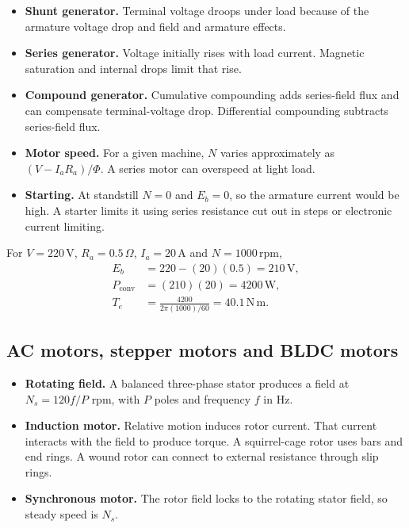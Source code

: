 \documentclass[12pt,a4paper]{article}
\begin{document}
\begin{itemize}[leftmargin=*, itemsep=3pt, topsep=4pt]
  \item \textbf{Shunt generator.} Terminal voltage droops under load because of the armature voltage drop and field and armature effects.
  \item \textbf{Series generator.} Voltage initially rises with load current. Magnetic saturation and internal drops limit that rise.
  \item \textbf{Compound generator.} Cumulative compounding adds series-field flux and can compensate terminal-voltage drop. Differential compounding subtracts series-field flux.
  \item \textbf{Motor speed.} For a given machine, \(N\) varies approximately as \((V-I_aR_a)/\Phi\). A series motor can overspeed at light load.
  \item \textbf{Starting.} At standstill \(N=0\) and \(E_b=0\), so the armature current would be high. A starter limits it using series resistance cut out in steps or electronic current limiting.
\end{itemize}

\begin{tcolorbox}[examplebox,title={DC motor back emf and converted torque}]
For \(V=220\,\mathrm V\), \(R_a=0.5\,\Omega\), \(I_a=20\,\mathrm A\) and \(N=1000\,\mathrm{rpm}\),
\[
\begin{aligned}
E_b&=220-(20)(0.5)=210\,\mathrm V,\\
P_{\mathrm{conv}}&=(210)(20)=4200\,\mathrm W,\\
T_e&=\frac{4200}{2\pi(1000)/60}=40.1\,\mathrm{N\,m}.
\end{aligned}
\]
\end{tcolorbox}

\subsection{AC motors, stepper motors and BLDC motors}
\begin{itemize}[leftmargin=*, itemsep=3pt, topsep=4pt]
  \item \textbf{Rotating field.} A balanced three-phase stator produces a field at \(N_s=120f/P\) rpm, with \(P\) poles and frequency \(f\) in Hz.
  \item \textbf{Induction motor.} Relative motion induces rotor current. That current interacts with the field to produce torque. A squirrel-cage rotor uses bars and end rings. A wound rotor can connect to external resistance through slip rings.
  \item \textbf{Synchronous motor.} The rotor field locks to the rotating stator field, so steady speed is \(N_s\).
\end{itemize}
\end{document}
